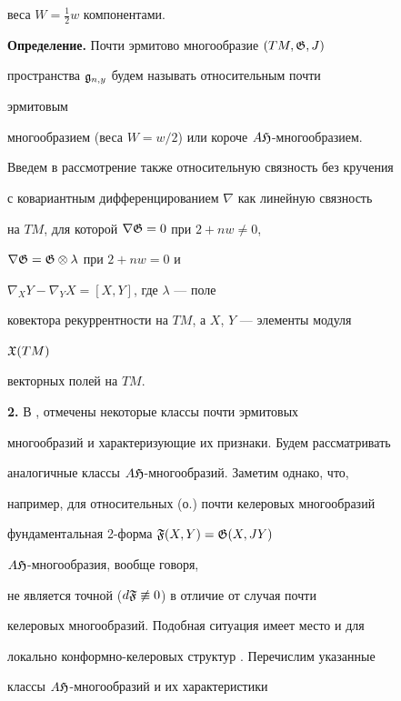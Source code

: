 веса $W=\frac{1}{2}w$ компонентами. 


\medskip 


 


{\bf Определение.} Почти эрмитово многообразие $(TM,\frak G,J)$ 


пространства $\frak g_{n,y}$ будем называть относительным почти 


эрмитовым  


многообразием (веса $W=w/2$) или короче $A\frak H$-многообразием. 


\medskip 


 


Введем в рассмотрение также относительную связность без кручения 


с ковариантным дифференцированием $\nabla$ как линейную связность 


на $TM$, для которой $\nabla\frak G=0$ при $2+nw\ne0$, 


$\nabla\frak G=\frak G\otimes\lambda$ при $2+nw=0$ и 


$\nabla_X Y-\nabla_Y X=[X,Y]$, где $\lambda$ --- поле 


ковектора рекуррентности на $TM$, а $X$, $Y$ --- элементы модуля 


$\frak X(TM)$ 


векторных полей на $TM$. 


\medskip 


 


{\bf 2.} В \cite{3}, \cite{4} отмечены некоторые классы почти эрмитовых 


многообразий и характеризующие их признаки. Будем рассматривать  


аналогичные классы $A\frak H$-многообразий. Заметим однако, что, 


например, для относительных (о.) почти келеровых многообразий 


фундаментальная 2-форма $\frak F(X,Y)=\frak G(X,JY)$\; 


$A\frak H$-многообразия, вообще говоря, 


не является точной ($d\frak F\not\equiv 0$) в отличие от случая почти 


келеровых многообразий. Подобная ситуация имеет место и для 


локально конформно-келеровых структур \cite{5}. Перечислим указанные 


классы $A\frak H$-многообразий и их характеристики 


